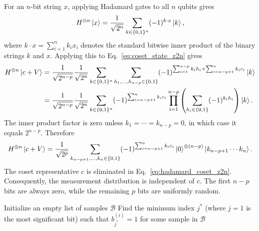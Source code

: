 For an $n$-bit string $x$, applying Hadamard gates to all $n$ qubits gives
\begin{equation}
    H^{\otimes n}\ket{x}
    =
    \frac{1}{\sqrt{2^n}}
    \sum_{k\in\{0,1\}^n}(-1)^{k\cdot x}\ket{k},
\end{equation}
where $k \cdot x = \sum_{i=1}^n k_i x_i$ denotes the standard bitwise inner product of the binary strings $k$ and $x$. Applying this to Eq.~\eqref{eq:coset_state_z2n} gives
\begin{align}
    H^{\otimes n}\ket{c+V}
    &=
    \frac{1}{\sqrt{2^{n-p}}}\frac{1}{\sqrt{2^n}}
    \sum_{k\in\{0,1\}^n}
    \sum_{h_1,\ldots,h_{n-p}\in\{0,1\}}
    (-1)^{\sum_{i=1}^{n-p}k_ih_i+\sum_{i=n-p+1}^{n}k_ic_i}
    \ket{k} \nonumber\\
    &=
    \frac{1}{\sqrt{2^{n-p}}}\frac{1}{\sqrt{2^n}}
    \sum_{k\in\{0,1\}^n}
    (-1)^{\sum_{i=n-p+1}^{n}k_ic_i}
    \prod_{i=1}^{n-p}\left(\sum_{h_i\in\{0,1\}}(-1)^{k_ih_i}\right)
    \ket{k}.
\end{align}
The inner product factor is zero unless $k_1=\cdots=k_{n-p}=0$, in which case it equals $2^{n-p}$.
Therefore
\begin{equation}
    H^{\otimes n}\ket{c+V}
    =
    \frac{1}{\sqrt{2^p}}
    \sum_{k_{n-p+1},\ldots,k_n\in\{0,1\}}
    (-1)^{\sum_{i=n-p+1}^{n}k_ic_i}
    \ket{0}^{\otimes(n-p)}\ket{k_{n-p+1}\cdots k_n}.
    \label{eq:hadamard_coset_z2n}
\end{equation}
The coset representative $c$ is eliminated in Eq.~\eqref{eq:hadamard_coset_z2n}.
Consequently, the measurement distribution is independent of $c$. The first $n-p$ bits are always zero, while the remaining $p$ bits are uniformly random. 
\begin{algorithm}[t]
\caption{\(\myqc-0\) Sampling for $V\le \mathbb{Z}_{2^n}$}
\label{alg:transversal_hadamard_sampling}

Initialize an empty list of samples $\mathcal{B}$\;
Find the minimum index $j^*$ (where $j=1$ is the most significant bit) such that $b^{(i)}_{j^*}=1$ for some sample in $\mathcal{B}$\;
\;
\end{algorithm}

